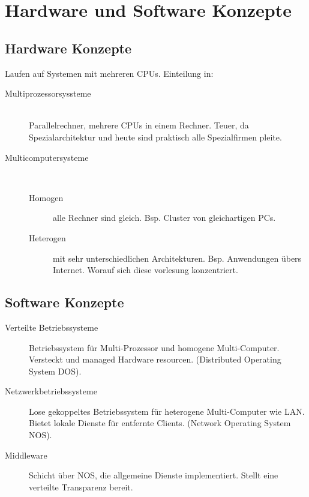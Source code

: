 \chapter{Hardware und Software Konzepte}

\section{Hardware Konzepte}

Laufen auf Systemen mit mehreren CPUs. Einteilung in:
\begin{description}
	\item[Multiprozessorsyssteme] \hfill \\
		Parallelrechner, mehrere CPUs in einem Rechner. Teuer, da Spezialarchitektur und heute sind praktisch alle Spezialfirmen pleite.
	\item[Multicomputersysteme] \hfill \\
		\begin{description}
			\item[Homogen] alle Rechner sind gleich. Bsp. Cluster von gleichartigen PCs.
			\item[Heterogen] mit sehr unterschiedlichen Architekturen. Bsp. Anwendungen übers Internet. Worauf sich diese vorlesung konzentriert.
		\end{description}
\end{description}

\section{Software Konzepte}

\begin{description}
	\item[Verteilte Betriebssysteme] Betriebssystem für Multi-Prozessor und homogene Multi-Computer. Versteckt und managed Hardware resourcen. (Distributed Operating System DOS).
	\item[Netzwerkbetriebssysteme] Lose gekoppeltes Betriebssystem für heterogene Multi-Computer wie LAN. Bietet lokale Dienste für entfernte Clients. (Network Operating System NOS).
	\item[Middleware] Schicht über NOS, die allgemeine Dienste implementiert. Stellt eine verteilte Transparenz bereit.
\end{description}
